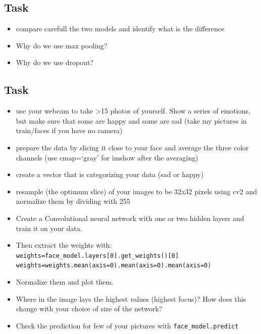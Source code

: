\documentclass[
  letterpaper,
  DIV=11,
  numbers=noendperiod]{scrartcl}
\providecommand{\tightlist}{%
  \setlength{\itemsep}{0pt}\setlength{\parskip}{0pt}}\usepackage{longtable,booktabs,array}
\begin{document}
\subsection{Task}\label{task-1}

\begin{itemize}
\tightlist
\item
  compare carefull the two models and identify what is the difference
\item
  Why do we use max pooling?
\item
  Why do we use dropout?
\end{itemize}

\subsection{Task}\label{task-2}

\begin{itemize}
\tightlist
\item
  use your webcam to take \textgreater15 photos of yourself. Show a
  series of emotions, but make sure that some are happy and some are sad
  (take my pictures in train/faces if you have no camera)
\item
  prepare the data by slicing it close to your face and average the
  three color channels (use cmap=`gray' for imshow after the averaging)
\item
  create a vector that is categorizing your data (sad or happy)
\item
  resample (the optimum slice) of your images to be 32x32 pixels using
  cv2 and normalize them by dividing with 255
\item
  Create a Convolutional neural network with one or two hidden layers
  and train it on your data.
\item
  Then extract the weights with:
  \texttt{weights=face\_model.layers{[}0{]}.get\_weights(){[}0{]}}
  \texttt{weights=weights.mean(axis=0).mean(axis=0).mean(axis=0)}
\item
  Normalize them and plot them.
\item
  Where in the image lays the highest values (highest focus)? How does
  this change with your choice of size of the network?
\item
  Check the prediction for few of your pictures with
  \texttt{face\_model.predict}
\end{itemize}
\end{document}
